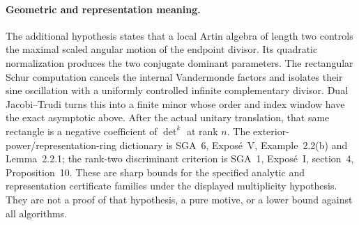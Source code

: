 \paragraph{Geometric and representation meaning.}
The additional hypothesis states that a local Artin algebra of length
two controls the maximal scaled angular motion of the endpoint divisor.
Its quadratic normalization produces the two conjugate dominant
parameters. The rectangular Schur computation cancels the internal
Vandermonde factors and isolates their sine oscillation with a uniformly
controlled infinite complementary divisor. Dual Jacobi--Trudi turns
this into a finite minor whose order and index window have the exact
asymptotic above. After the actual unitary translation, that same
rectangle is a negative coefficient of $\det^k$ at rank $n$.
The exterior-power/representation-ring dictionary is SGA~6, Expos\'e~V,
Example~2.2(b) and Lemma~2.2.1; the rank-two discriminant criterion is
SGA~1, Expos\'e~I, section~4, Proposition~10. These are sharp bounds
for the specified analytic and representation certificate families
under the displayed multiplicity hypothesis. They are not a proof
of that hypothesis, a pure motive, or a lower bound against all
algorithms.
